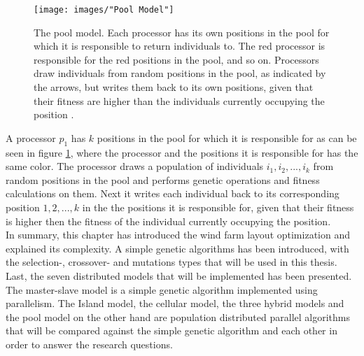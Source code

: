 \begin{figure}[h!]
\begin{center}
\texttt{[image: images/"Pool Model"]}
\caption{The pool model. Each processor has its own positions in the pool for which it is responsible to return individuals to. The red processor is responsible for the red positions in the pool, and so on. Processors draw individuals from random positions in the pool, as indicated by the arrows, but writes them back to its own positions, given that their fitness are higher than the individuals currently occupying the position \citep{Gong}.}
\label{Pool Model}
\end{center}
\end{figure}


\noindent A processor $p_1$ has $k$ positions in the pool for which it is responsible for as can be seen in figure \ref{Pool Model}, where the processor and the positions it is responsible for has the same color. The processor draws a population of individuals $i_1, i_2,...,i_k$ from random positions in the pool and performs genetic operations and fitness calculations on them. Next it writes each individual back to its corresponding position $1, 2,...,k$ in the the positions it is responsible for, given that their fitness is higher then the fitness of the individual currently occupying the position.\\


\noindent In summary, this chapter has introduced the wind farm layout optimization and explained its complexity. A simple genetic algorithms has been introduced, with the selection-, crossover- and mutations types that will be used in this thesis. Last, the seven distributed models that will be implemented has been presented. The master-slave model is a simple genetic algorithm implemented using parallelism. The Island model, the cellular model, the three hybrid models and the pool model on the other hand are population distributed parallel algorithms that  will be compared against the simple genetic algorithm and each other in order to answer the research questions. 
